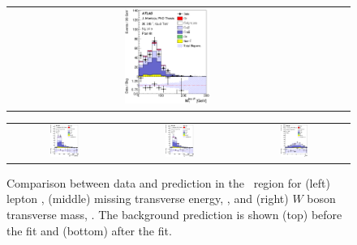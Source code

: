 \begin{figure}[tp]
\begin{tabular}{ccc}
  \includegraphics[width=0.27\textwidth]{Analysis/Figures_ttH/tesis_vars/postfit/WlepMT_5jetex4btagin.eps} \\
\end{tabular}
\caption{Comparison between data and prediction in the \fivefour\ region for (left) lepton \pt,  (middle) missing transverse energy, \met, and (right)  $W$ boson transverse mass, \mtw. The background prediction is shown (top) before the fit and (bottom) after the fit.}
  \label{fig:vars1_fivefour}
\vspace{0.5cm}
  \centering
  \begin{tabular}{ccc}
  \includegraphics[width=0.27\textwidth]{Analysis/Figures_ttH/tesis_vars/prefit/jet1_pt_5jetex4btagin.eps} &
  \includegraphics[width=0.27\textwidth]{Analysis/Figures_ttH/tesis_vars/prefit/bjet1_pt_5jetex4btagin.eps} &
  \includegraphics[width=0.27\textwidth]{Analysis/Figures_ttH/tesis_vars/prefit/lep_eta_5jetex4btagin.eps} \\

\end{tabular}
\end{figure}
